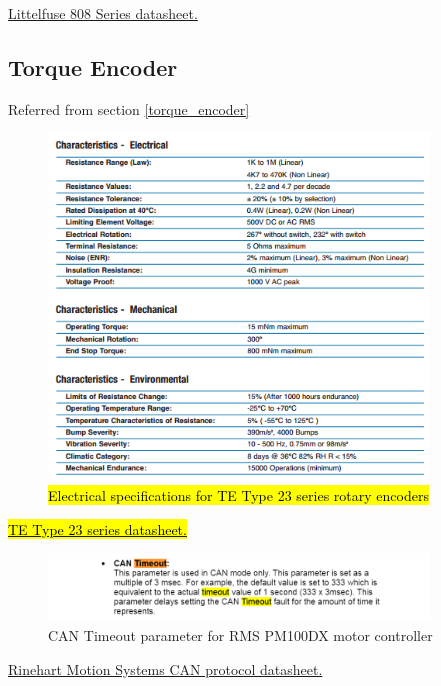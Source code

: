 \documentclass{article}
\begin{document}
\href{http://www.littelfuse.com/~/media/c635bf51279f4ef6bedee5deb356e102.ashx}{Littelfuse 808 Series datasheet.}

\setcounter{subsection}{6}
\subsection{Torque Encoder}\label{appendix_torque_encoder}
Referred from section \ref{torque_encoder}

\begin{figure}[H]
    \centering
    \includegraphics[width=0.9\textwidth]{Type_23_series_specs.png}
    \caption{\hl{Electrical specifications for TE Type 23 series rotary encoders}}
    \label{fig:type_23_series}
\end{figure}

\href{http://www.mouser.com/ds/2/418/NG_DS_1773115_E-717082.pdf}{\hl{TE Type 23 series datasheet.}}

\begin{figure}[H]
    \centering
    \includegraphics[width=0.9\textwidth]{RMS_CAN_timeout.png}
    \caption{CAN Timeout parameter for RMS PM100DX motor controller}
    \label{fig:RMS_CAN_timeout}
\end{figure}

\href{https://app.box.com/s/4fb49r9p6lzfz4uwcb5izkxpcwh768vc}{Rinehart Motion Systems CAN protocol datasheet.}
\end{document}
